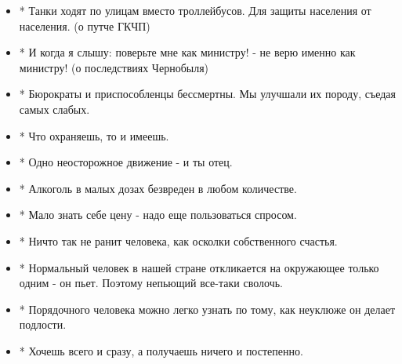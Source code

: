 \begin{itemize}
\item * Танки ходят по улицам вместо троллейбусов. Для защиты населения от
населения. (о путче ГКЧП)
\item * И когда я слышу: поверьте мне как министру! - не верю именно как
министру! (о последствиях Чернобыля)
\item * Бюрократы и приспособленцы бессмертны. Мы улучшали их породу, съедая
самых слабых.
\item * Что охраняешь, то и имеешь.
\item * Одно неосторожное движение - и ты отец.
\item * Алкоголь в малых дозах безвреден в любом количестве.
\item * Мало знать себе цену - надо еще пользоваться спросом.
\item * Ничто так не ранит человека, как осколки собственного счастья.
\item * Нормальный человек в нашей стране откликается на окружающее только
одним - он пьет. Поэтому непьющий все-таки сволочь.
\item * Порядочного человека можно легко узнать по тому, как неуклюже он
делает подлости.
\item * Хочешь всего и сразу, а получаешь ничего и постепенно.
\end{itemize}


